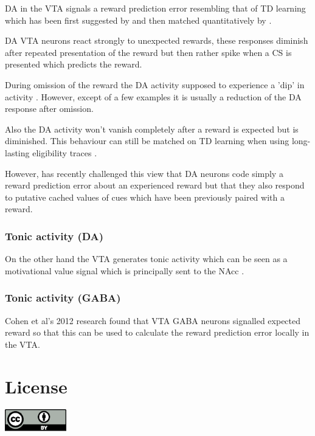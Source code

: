 \documentclass[12pt,a4paper]{article}
\begin{document}
DA in the VTA signals a reward prediction error resembling that of TD learning which has been first suggested by \citep{Schultz1997} and then matched quantitatively by \citep{Bayer2005}.

DA VTA neurons react strongly to unexpected rewards, these responses diminish after repeated presentation of the reward but then rather spike when a CS is presented which predicts the reward. 

During omission of the reward the DA activity supposed to experience a 'dip' in activity \citep{Takahashi2017}. However, except of a few examples it is usually a reduction of the DA response after omission. 

Also the DA activity won't vanish completely after a reward is expected but is diminished. This behaviour can still be matched on TD learning when using long-lasting eligibility traces \citep{Pan2005}.

However, \citep{Sadacca2016} has recently challenged this view that DA neurons code simply a reward prediction error about an experienced reward but that they also respond to putative cached values of cues which have been previously paired with a reward.

\subsubsection{Tonic activity (DA)}

On the other hand the VTA generates tonic activity which can be seen as a motivational value signal which is principally sent to the NAcc \citep{Sesack2010}\citep{Bromberg-Martin2010} .

\subsubsection{Tonic activity (GABA)}

Cohen et al’s 2012 research found that VTA GABA neurons signalled expected reward \citep{Cohen2012} so that this can be used to calculate the reward prediction error locally in the VTA.


\appendix

\section{License}



\includegraphics[width=0.2\textwidth]{by.eps}





\end{document}
